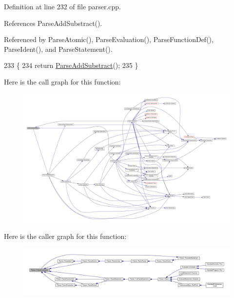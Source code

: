 Definition at line 232 of file parser.\+cpp.



References Parse\+Add\+Substract().



Referenced by Parse\+Atomic(), Parse\+Evaluation(), Parse\+Function\+Def(), Parse\+Ident(), and Parse\+Statement().


\begin{DoxyCode}
233 \{
234     \textcolor{keywordflow}{return} \hyperlink{classParser_a47ba11ddd167c1b0b5cf1d2fd1cf1ccd}{ParseAddSubstract}();
235 \}
\end{DoxyCode}


Here is the call graph for this function\+:\nopagebreak
\begin{figure}[H]
\begin{center}
\leavevmode
\includegraphics[width=350pt]{classParser_ae46b0a87abe76f40ae117c5bdcb2f29d_cgraph}
\end{center}
\end{figure}




Here is the caller graph for this function\+:\nopagebreak
\begin{figure}[H]
\begin{center}
\leavevmode
\includegraphics[width=350pt]{classParser_ae46b0a87abe76f40ae117c5bdcb2f29d_icgraph}
\end{center}
\end{figure}


